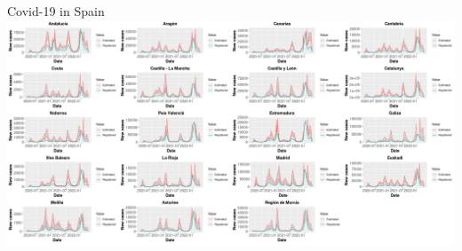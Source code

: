 \documentclass[aspectratio=169,usepdftitle=true]{beamer}
\begin{document}
\begin{frame}[fragile]{Covid-19 in Spain}
\centering
\includegraphics[scale=0.21]{spain_CCAA.png}
\end{frame}
\end{document}
